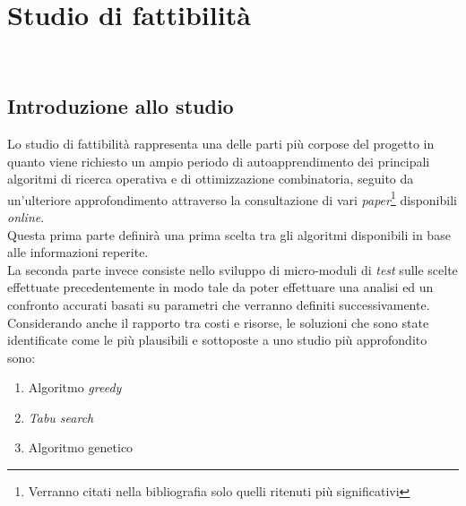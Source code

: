 
\chapter{Studio di fattibilità}
\label{cap:studio-fattibilita}

\noindent {}\\

\section{Introduzione allo studio}
\noindent Lo studio di fattibilità rappresenta una delle parti più corpose
del progetto in quanto viene richiesto un ampio periodo di autoapprendimento
dei principali algoritmi di ricerca operativa e di ottimizzazione combinatoria,
seguito da un'ulteriore approfondimento attraverso la consultazione di vari \textit{paper}\footnote[2]{Verranno citati nella bibliografia solo quelli ritenuti più significativi}
disponibili \textit{online}.\\

\noindent Questa prima parte definirà una prima scelta tra gli algoritmi disponibili in base alle informazioni reperite.\\

\noindent La seconda parte invece consiste nello sviluppo di micro-moduli di \textit{test} sulle scelte effettuate
precedentemente in modo tale da poter effettuare una analisi ed un confronto accurati basati su parametri che verranno
definiti successivamente.\\

\noindent Considerando anche il rapporto tra costi e risorse, le soluzioni che sono state identificate come le più plausibili e sottoposte a uno studio più approfondito sono:
\begin{enumerate}
    \item Algoritmo \textit{greedy}
    \item \textit{Tabu search}
    \item Algoritmo genetico
\end{enumerate}

